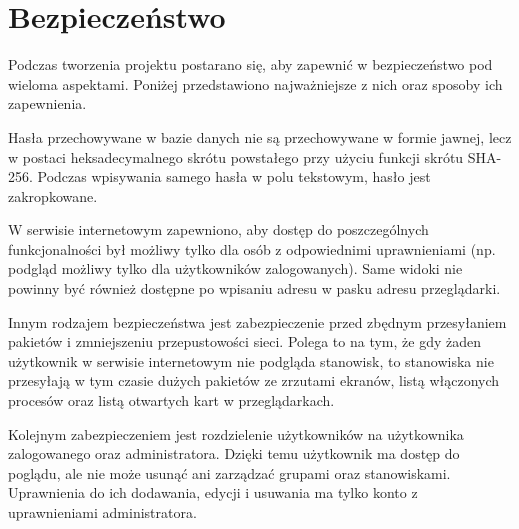 \section{Bezpieczeństwo}

Podczas tworzenia projektu postarano się, aby zapewnić w bezpieczeństwo pod wieloma aspektami. Poniżej przedstawiono najważniejsze z nich oraz sposoby ich zapewnienia.
\newline

Hasła przechowywane w bazie danych nie są przechowywane w formie jawnej, lecz w postaci heksadecymalnego skrótu powstałego przy użyciu funkcji skrótu SHA-256.  Podczas wpisywania samego hasła w polu tekstowym, hasło jest zakropkowane.


W serwisie internetowym zapewniono, aby dostęp do poszczególnych funkcjonalności był możliwy tylko dla osób z odpowiednimi uprawnieniami (np. podgląd możliwy tylko dla użytkowników zalogowanych). Same widoki nie powinny być również dostępne po wpisaniu adresu w pasku adresu przeglądarki. 


Innym rodzajem bezpieczeństwa jest zabezpieczenie przed zbędnym przesyłaniem pakietów i zmniejszeniu przepustowości sieci. Polega to na tym, że gdy żaden użytkownik w serwisie internetowym nie podgląda stanowisk, to stanowiska nie przesyłają w tym czasie dużych pakietów ze zrzutami ekranów, listą włączonych procesów oraz listą otwartych kart w przeglądarkach.


Kolejnym zabezpieczeniem jest rozdzielenie użytkowników na użytkownika zalogowanego oraz administratora. Dzięki temu użytkownik ma dostęp do poglądu, ale nie może usunąć ani zarządzać grupami oraz stanowiskami. Uprawnienia do ich dodawania, edycji i usuwania ma tylko konto z uprawnieniami administratora.